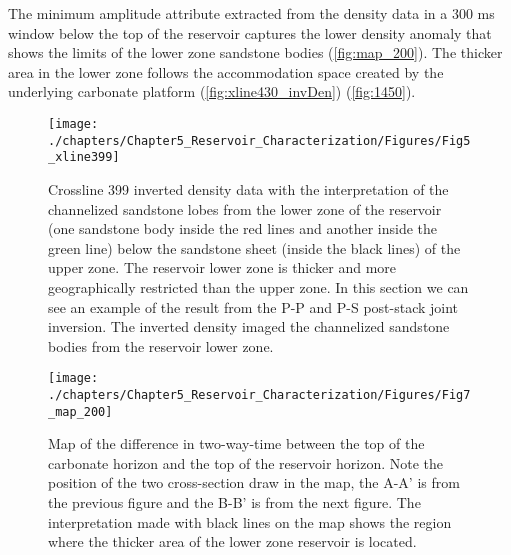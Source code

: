 	The minimum amplitude attribute extracted from the density data in a 300 ms window below the top of the reservoir  captures the lower density anomaly that shows the limits of the lower zone sandstone bodies (\ref{fig:map_200}). The thicker area in the lower zone follows the accommodation space created by the underlying carbonate platform (\ref{fig:xline430_invDen}) (\ref{fig:1450}). 






\begin{figure}[hbtp]
	\begin{center}
	\texttt{[image: ./chapters/Chapter5\_Reservoir\_Characterization/Figures/Fig5\_xline399]}
			\caption[Crossline 399 inverted density data with the interpretation of the channelized sand sheets from the lower zone of the reservoir below the sandstone sheet of the upper zone.]{Crossline 399 inverted density data with the interpretation of the channelized sandstone lobes from the lower zone of the reservoir (one sandstone body inside the red lines and another inside the green line) below the sandstone sheet (inside the black lines) of the upper zone. The reservoir lower zone is thicker and more geographically restricted than the upper zone. In this section we can see an example of the result from the P-P and P-S post-stack joint inversion. The inverted density imaged the channelized sandstone bodies from the reservoir lower zone. }
			\label{fig:xline399_invDen}
		\end{center}
	\end{figure}


\begin{figure}[hbtp]
	\begin{center}
	\texttt{[image: ./chapters/Chapter5\_Reservoir\_Characterization/Figures/Fig7\_map\_200]}
			\caption[Isochron map between the top of the carbonate horizon and the top of the reservoir horizon. Note the position of the two cross-sections drawn on the map, A-A' is from the previous figure and  B-B' is from the next figure.]{Map of the difference in two-way-time between the top of the carbonate horizon and the top of the reservoir horizon. Note the position of the two cross-section draw in the map, the A-A' is from the previous figure and the B-B' is from the next figure. The interpretation made with black lines on the map shows the region where the thicker area of the lower zone reservoir is located.}
			\label{fig:map_200_300ms}
		\end{center}
	\end{figure}



